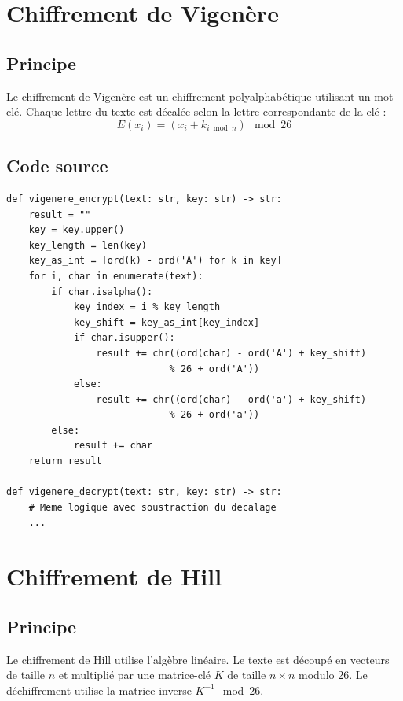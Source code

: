 \documentclass[12pt,a4paper]{report}
\begin{document}
\section{Chiffrement de Vigenère}

\subsection{Principe}
Le chiffrement de Vigenère est un chiffrement polyalphabétique utilisant un mot-clé. Chaque lettre du texte est décalée selon la lettre correspondante de la clé :
$$E(x_i) = (x_i + k_{i \bmod n}) \mod 26$$

\subsection{Code source}
\begin{lstlisting}[style=python,caption=vigenere.py]
def vigenere_encrypt(text: str, key: str) -> str:
    result = ""
    key = key.upper()
    key_length = len(key)
    key_as_int = [ord(k) - ord('A') for k in key]
    for i, char in enumerate(text):
        if char.isalpha():
            key_index = i % key_length
            key_shift = key_as_int[key_index]
            if char.isupper():
                result += chr((ord(char) - ord('A') + key_shift)
                             % 26 + ord('A'))
            else:
                result += chr((ord(char) - ord('a') + key_shift)
                             % 26 + ord('a'))
        else:
            result += char
    return result

def vigenere_decrypt(text: str, key: str) -> str:
    # Meme logique avec soustraction du decalage
    ...
\end{lstlisting}

\section{Chiffrement de Hill}

\subsection{Principe}
Le chiffrement de Hill utilise l'algèbre linéaire. Le texte est découpé en vecteurs de taille $n$ et multiplié par une matrice-clé $K$ de taille $n \times n$ modulo 26. Le déchiffrement utilise la matrice inverse $K^{-1} \mod 26$.
\end{document}

